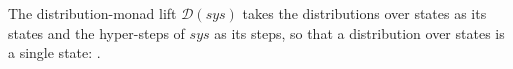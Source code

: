 \begin{definition}
  \label{def:dist}
  \leanok
  The distribution-monad lift $\mathcal{D}(sys)$ takes the distributions over states as its states and the hyper-steps of $sys$ as its steps, so that a distribution over states is a single state: .
\end{definition}
